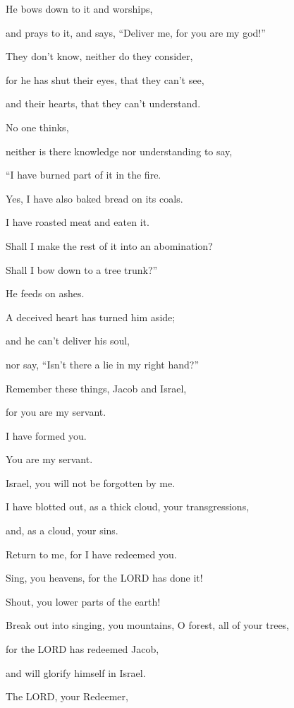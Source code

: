 He bows down to it and worships,

and prays to it, and says, “Deliver me, for you are my god!”


\vspace{\baselineskip} \myverse{}They don’t know, neither do they consider,

for he has shut their eyes, that they can’t see,

and their hearts, that they can’t understand.

\myverse{}No one thinks,

neither is there knowledge nor understanding to say,

“I have burned part of it in the fire.

Yes, I have also baked bread on its coals.

I have roasted meat and eaten it.

Shall I make the rest of it into an abomination?

Shall I bow down to a tree trunk?”

\myverse{}He feeds on ashes.

A deceived heart has turned him aside;

and he can’t deliver his soul,

nor say, “Isn’t there a lie in my right hand?”


\vspace{\baselineskip} \myverse{}Remember these things, Jacob and Israel,

for you are my servant.

I have formed you.

You are my servant.

Israel, you will not be forgotten by me.

\myverse{}I have blotted out, as a thick cloud, your transgressions,

and, as a cloud, your sins.

Return to me, for I have redeemed you.


\vspace{\baselineskip} \myverse{}Sing, you heavens, for the LORD has done it!

Shout, you lower parts of the earth!

Break out into singing, you mountains, O forest, all of your trees,

for the LORD has redeemed Jacob,

and will glorify himself in Israel.


\vspace{\baselineskip} \myverse{}The LORD, your Redeemer,

